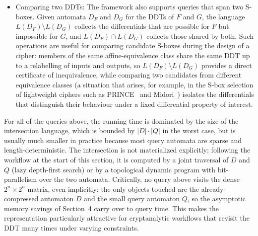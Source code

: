 \begin{itemize}
    \item Comparing two DDTs: The framework also supports queries that
          span two S-boxes. Given automata $D_F$ and $D_G$ for the DDTs
          of $F$ and $G$, the language $L(D_F) \setminus L(D_G)$
          collects the differentials that are possible for $F$ but
          impossible for $G$, and $L(D_F) \cap L(D_G)$ collects those
          shared by both. Such operations are useful for comparing
          candidate S-boxes during the design of a cipher: members of
          the same affine-equivalence class share the same DDT up to a
          relabelling of inputs and outputs, so $L(D_F) \setminus
          L(D_G)$ provides a direct certificate of inequivalence,
          while comparing two candidates from different equivalence
          classes (a situation that arises, for example, in the S-box
          selection of lightweight ciphers such as PRINCE~\cite{BorghoffEtAl2012} and
          Midori~\cite{BanikEtAl2015}) isolates the differentials that distinguish
          their behaviour under a fixed differential property of
          interest.
\end{itemize}

For all of the queries above, the running time is dominated by the size
of the intersection language, which is bounded by $|D| \cdot |Q|$ in the
worst case, but is usually much smaller in practice because most query
automata are sparse and length-deterministic. The intersection is not
materialized explicitly; following the workflow at the start of this
section, it is computed by a joint traversal of $D$ and $Q$ (lazy
depth-first search) or by a topological dynamic program with
bit-parallelism over the two automata. Critically, no query above visits
the dense $2^{n} \times 2^{n}$ matrix, even implicitly: the only objects
touched are the already-compressed automaton $D$ and the small query
automaton $Q$, so the asymptotic memory savings of Section~4 carry over
to query time. This makes the representation particularly attractive
for cryptanalytic workflows that revisit the DDT many times under
varying constraints.
